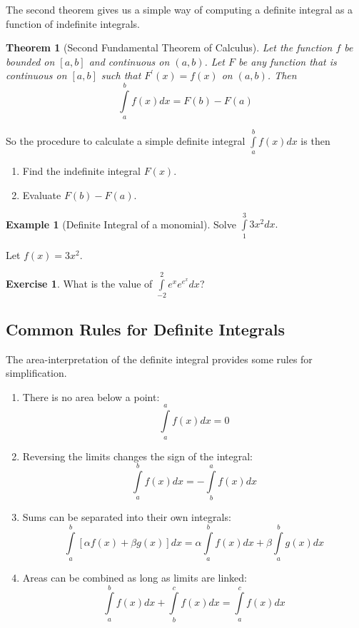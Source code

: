 \documentclass[
]{book}
\providecommand{\tightlist}{%
  \setlength{\itemsep}{0pt}\setlength{\parskip}{0pt}}
\newtheorem{theorem}{Theorem}[chapter]
\theoremstyle{definition}
\theoremstyle{definition}
\newtheorem{example}{Example}[chapter]
\theoremstyle{definition}
\newtheorem{exercise}{Exercise}[chapter]
\theoremstyle{remark}
\begin{document}
The second theorem gives us a simple way of computing a definite integral as a function of indefinite integrals.

\begin{theorem}[Second Fundamental Theorem of Calculus]
\protect\hypertarget{thm:unnamed-chunk-28}{}{\label{thm:unnamed-chunk-28} {} }Let the function \(f\) be bounded on \([a,b]\) and continuous on \((a,b)\). Let \(F\) be any function that is continuous on \([a,b]\) such that \(F^\prime(x)=f(x)\) on \((a,b)\). Then \[\int\limits_a^bf(x)dx = F(b)-F(a)\]
\end{theorem}

So the procedure to calculate a simple definite integral \(\int\limits_a^b f(x)dx\) is then

\begin{enumerate}
\def\labelenumi{\arabic{enumi}.}
\tightlist
\item
  Find the indefinite integral \(F(x)\).
\item
  Evaluate \(F(b)-F(a)\).
\end{enumerate}

\begin{example}[Definite Integral of a monomial]
\protect\hypertarget{exm:defintmon}{}{\label{exm:defintmon} {} }Solve \(\int\limits_1^3 3x^2 dx.\)

Let \(f(x) = 3x^2\).
\end{example}

\begin{exercise}
\protect\hypertarget{exr:unnamed-chunk-29}{}{\label{exr:unnamed-chunk-29} }What is the value of \(\int\limits_{-2}^2 e^x e^{e^x} dx\)?
\end{exercise}

\hypertarget{common-rules-for-definite-integrals}{%
\subsection*{Common Rules for Definite Integrals}\label{common-rules-for-definite-integrals}}

The area-interpretation of the definite integral provides some rules for simplification.

\begin{enumerate}
\def\labelenumi{\arabic{enumi}.}
\tightlist
\item
  There is no area below a point: \[\int\limits_a^a f(x)dx=0\]
\item
  Reversing the limits changes the sign of the integral: \[\int\limits_a^b f(x)dx=-\int\limits_b^a f(x)dx\]
\item
  Sums can be separated into their own integrals: \[\int\limits_a^b [\alpha f(x)+\beta g(x)]dx = \alpha \int\limits_a^b f(x)dx + \beta \int\limits_a^b g(x)dx\]
\item
  Areas can be combined as long as limits are linked: \[\int\limits_a^b f(x) dx +\int\limits_b^c f(x)dx = \int\limits_a^c f(x)dx\]
\end{enumerate}
\end{document}
